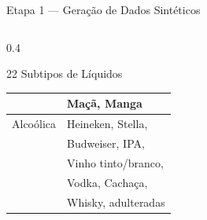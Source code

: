 \documentclass[aspectratio=169, 11pt]{beamer}
\begin{document}
\begin{frame}{Etapa 1 — Geração de Dados Sintéticos}
\begin{columns}[T]
\begin{column}{0.4\textwidth}
\begin{block}{22 Subtipos de Líquidos}
\begin{tabular}{ll}
                & Maçã, Manga \\
          \midrule
          Alcoólica & Heineken, Stella, \\
                    & Budweiser, IPA, \\
                    & Vinho tinto/branco, \\
                    & Vodka, Cachaça, \\
                    & Whisky, adulteradas \\
          \bottomrule
        \end{tabular}
      \end{block}
    \end{column}
  \end{columns}
\end{frame}

\end{document}
